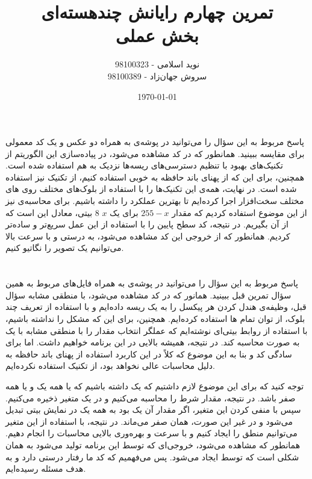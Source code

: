 \documentclass[12pt,onecolumn,a4paper]{article}
\begin{document}
\begin{titlepage}
\title{تمرین چهارم رایانش چندهسته‌ای \\ بخش عملی} 
\author{نوید اسلامی - 98100323 \\ سروش جهان‌زاد - 98100389}
\date{\today}
\maketitle
\end{titlepage}

\section*{}
پاسخ مربوط به این سؤال را می‌توانید در پوشه‌ی  به همراه دو عکس و یک کد  معمولی برای مقایسه ببینید. همانطور که در کد  مشاهده می‌شود، در پیاده‌سازی این الگوریتم از تکنیک‌های بهبود  با تنظیم دسترسی‌های ریسه‌ها نزدیک به هم استفاده شده است. همچنین، برای این که از پهنای باند حافظه به خوبی استفاده کنیم، از تکنیک  نیز استفاده شده است. در نهایت، همه‌ی این تکنیک‌ها را با استفاده از بلوک‌های مختلف روی های مختلف سخت‌افزار اجرا کرده‌ایم تا بهترین عملکرد را داشته باشیم. برای محاسبه‌ی  نیز از این موضوع استفاده کردیم که مقدار $255 - x$ برای یک $x$ 8 بیتی، معادل این است که از آن  بگیریم. در نتیجه، کد سطح پایین را با استفاده از این عمل سریع‌تر و ساده‌تر کردیم. همانطور که از خروجی این کد مشاهده می‌شود، به درستی و با سرعت بالا می‌توانیم یک تصویر را نگاتیو کنیم.

\section*{}
پاسخ مربوط به این سؤال را می‌توانید در پوشه‌ی  به همراه فایل‌های مربوط به همین سؤال تمرین قبل ببینید. همانور که در کد  مشاهده می‌شود، با منطقی مشابه سؤال قبل، وظیفه‌ی هندل کردن هر پیکسل را به یک ریسه داده‌ایم و با استفاده از تعریف چند بلوک، از توان تمام ها استفاده کرده‌ایم. همچنین، برای این که مشکل  را نداشته باشیم، با استفاده از  روابط بیتی‌ای نوشته‌ایم که عملگر انتخاب مقدار را با منطقی مشابه با یک  به صورت  محاسبه کند. در نتیجه، همیشه  بالایی در این برنامه خواهیم داشت. اما برای سادگی کد و بنا به این موضوع که کلاً در این کاربرد استفاده از پهنای باند حافظه به دلیل محاسبات عالی نخواهد بود، از تکنیک  استفاده نکرده‌ایم.

توجه کنید که برای این موضوع لازم داشتیم که یک  داشته باشیم که یا همه یک و یا همه صفر باشد. در نتیجه،‌ مقدار شرط را محاسبه می‌کنیم و در یک متغیر  ذخیره می‌کنیم. سپس با منفی کردن این متغیر، اگر مقدار آن یک بود به همه یک در نمایش بیتی تبدیل می‌شود و در غیر این صورت، همان صفر می‌ماند. در نتیجه، با استفاده از این متغیر می‌توانیم منطق  را ایجاد کنیم و با سرعت و بهره‌وری بالایی محاسبات را انجام دهیم. همانطور که مشاهده می‌شود، خروجی‌ای که توسط این برنامه تولید می‌شود به همان شکلی است که توسط  ایجاد می‌شود. پس می‌فهمیم که کد ما رفتار درستی دارد و به هدف مسئله رسیده‌ایم.
\end{document}
